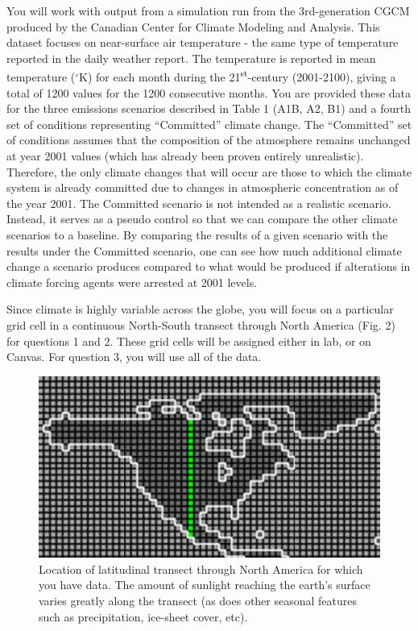 \documentclass[11pt,]{article}
\begin{document}
You will work with output from a simulation run from the 3rd-generation
CGCM produced by the Canadian Center for Climate Modeling and Analysis.
This dataset focuses on near-surface air temperature - the same type of
temperature reported in the daily weather report. The temperature is
reported in mean temperature (\(^\circ\)K) for each month during the
21\textsuperscript{st}-century (2001-2100), giving a total of 1200
values for the 1200 consecutive months. You are provided these data for
the three emissions scenarios described in Table 1 (A1B, A2, B1) and a
fourth set of conditions representing ``Committed'' climate change. The
``Committed'' set of conditions assumes that the composition of the
atmosphere remains unchanged at year 2001 values (which has already been
proven entirely unrealistic). Therefore, the only climate changes that
will occur are those to which the climate system is already committed
due to changes in atmospheric concentration as of the year 2001. The
Committed scenario is not intended as a realistic scenario. Instead, it
serves as a pseudo control so that we can compare the other climate
scenarios to a baseline. By comparing the results of a given scenario
with the results under the Committed scenario, one can see how much
additional climate change a scenario produces compared to what would be
produced if alterations in climate forcing agents were arrested at 2001
levels.

Since climate is highly variable across the globe, you will focus on a
particular grid cell in a continuous North-South transect through North
America (Fig. 2) for questions 1 and 2. These grid cells will be
assigned either in lab, or on Canvas. For question 3, you will use all
of the data.

\begin{figure}
\includegraphics[width=5.22in]{../_chapter_materials/transect_picture} \caption{Location of latitudinal transect through North America for which you have data. The amount of sunlight reaching the earth's surface varies greatly along the transect (as does other seasonal features such as precipitation, ice-sheet cover, etc).}\label{fig:transect-fig}
\end{figure}
\end{document}
